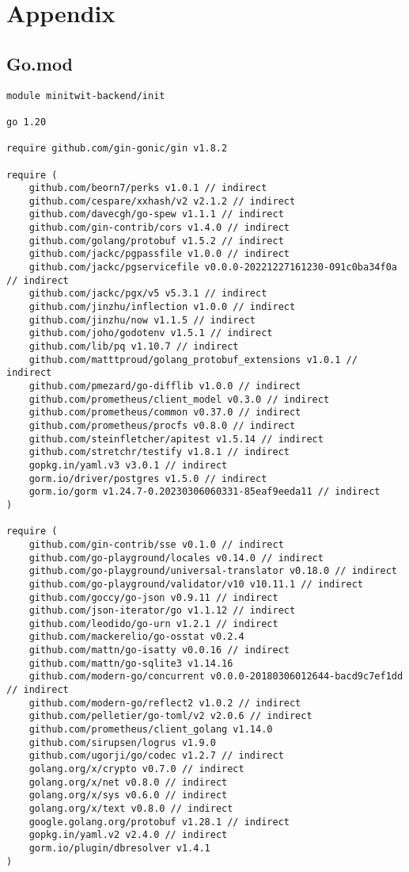 \section{Appendix}
\subsection{Go.mod}\label{subsec:go.mod}
\begin{lstlisting}
module minitwit-backend/init

go 1.20

require github.com/gin-gonic/gin v1.8.2

require (
	github.com/beorn7/perks v1.0.1 // indirect
	github.com/cespare/xxhash/v2 v2.1.2 // indirect
	github.com/davecgh/go-spew v1.1.1 // indirect
	github.com/gin-contrib/cors v1.4.0 // indirect
	github.com/golang/protobuf v1.5.2 // indirect
	github.com/jackc/pgpassfile v1.0.0 // indirect
	github.com/jackc/pgservicefile v0.0.0-20221227161230-091c0ba34f0a // indirect
	github.com/jackc/pgx/v5 v5.3.1 // indirect
	github.com/jinzhu/inflection v1.0.0 // indirect
	github.com/jinzhu/now v1.1.5 // indirect
	github.com/joho/godotenv v1.5.1 // indirect
	github.com/lib/pq v1.10.7 // indirect
	github.com/matttproud/golang_protobuf_extensions v1.0.1 // indirect
	github.com/pmezard/go-difflib v1.0.0 // indirect
	github.com/prometheus/client_model v0.3.0 // indirect
	github.com/prometheus/common v0.37.0 // indirect
	github.com/prometheus/procfs v0.8.0 // indirect
	github.com/steinfletcher/apitest v1.5.14 // indirect
	github.com/stretchr/testify v1.8.1 // indirect
	gopkg.in/yaml.v3 v3.0.1 // indirect
	gorm.io/driver/postgres v1.5.0 // indirect
	gorm.io/gorm v1.24.7-0.20230306060331-85eaf9eeda11 // indirect
)

require (
	github.com/gin-contrib/sse v0.1.0 // indirect
	github.com/go-playground/locales v0.14.0 // indirect
	github.com/go-playground/universal-translator v0.18.0 // indirect
	github.com/go-playground/validator/v10 v10.11.1 // indirect
	github.com/goccy/go-json v0.9.11 // indirect
	github.com/json-iterator/go v1.1.12 // indirect
	github.com/leodido/go-urn v1.2.1 // indirect
	github.com/mackerelio/go-osstat v0.2.4
	github.com/mattn/go-isatty v0.0.16 // indirect
	github.com/mattn/go-sqlite3 v1.14.16
	github.com/modern-go/concurrent v0.0.0-20180306012644-bacd9c7ef1dd // indirect
	github.com/modern-go/reflect2 v1.0.2 // indirect
	github.com/pelletier/go-toml/v2 v2.0.6 // indirect
	github.com/prometheus/client_golang v1.14.0
	github.com/sirupsen/logrus v1.9.0
	github.com/ugorji/go/codec v1.2.7 // indirect
	golang.org/x/crypto v0.7.0 // indirect
	golang.org/x/net v0.8.0 // indirect
	golang.org/x/sys v0.6.0 // indirect
	golang.org/x/text v0.8.0 // indirect
	google.golang.org/protobuf v1.28.1 // indirect
	gopkg.in/yaml.v2 v2.4.0 // indirect
	gorm.io/plugin/dbresolver v1.4.1
)
\end{lstlisting}

